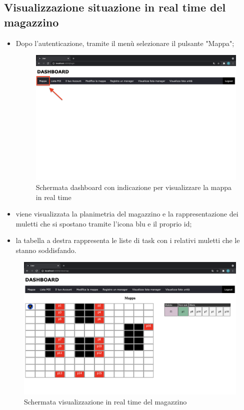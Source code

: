 \subsection{Visualizzazione situazione in real time del magazzino}
\begin{itemize}
    \item Dopo l'autenticazione, tramite il menù selezionare il pulsante "Mappa";
    \begin{figure}[H]
        \centering
        \includegraphics[scale=0.12]{res/images/dashboard1.png}
        \caption{Schermata dashboard con indicazione per visualizzare la mappa in real time}
    \end{figure}
    \item viene visualizzata la planimetria del magazzino e la rappresentazione dei muletti che si spostano tramite l'icona blu e il proprio id;
    \item la tabella a destra rappresenta le liste di task con i relativi muletti che le stanno soddisfando.
    
\end{itemize}

\begin{figure}[H]
    \centering
    \includegraphics[scale=0.12]{res/images/map_user.png}
    \caption{Schermata visualizzazione in real time del magazzino}
\end{figure}


